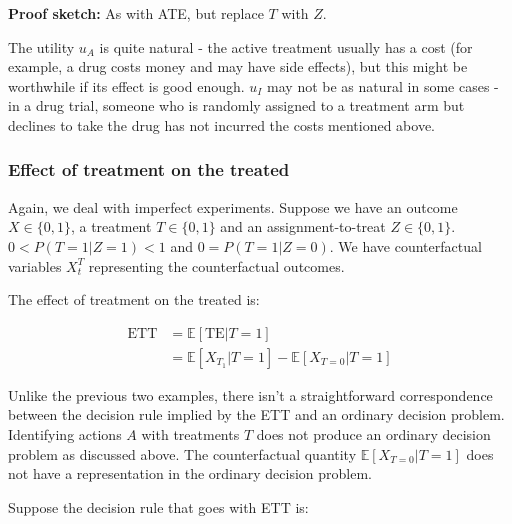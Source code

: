\textbf{Proof sketch:} As with ATE, but replace $T$ with $Z$.

\begin{remark}
The utility $u_A$ is quite natural - the active treatment usually has a cost (for example, a drug costs money and may have side effects), but this might be worthwhile if its effect is good enough. $u_I$ may not be as natural in some cases - in a drug trial, someone who is randomly assigned to a treatment arm but declines to take the drug has not incurred the costs mentioned above.
\end{remark}


\subsubsection{Effect of treatment on the treated}

Again, we deal with imperfect experiments. Suppose we have an outcome $X\in\{0,1\}$, a treatment $T\in\{0,1\}$ and an assignment-to-treat $Z\in\{0,1\}$. $0<P(T=1|Z=1)<1$ and $0=P(T=1|Z=0)$. We have counterfactual variables $X^T_t$ representing the counterfactual outcomes.

The effect of treatment on the treated is:

\begin{align}
    \text{ETT} &= \mathbb{E}[\text{TE}|T=1] \\
               &= \mathbb{E}[X_{T_1}|T=1] - \mathbb{E}[X_{T=0}|T=1]
\end{align}


Unlike the previous two examples, there isn't a straightforward correspondence between the decision rule implied by the ETT and an ordinary decision problem. Identifying actions $A$ with treatments $T$ does not produce an ordinary decision problem as discussed above. The counterfactual quantity $\mathbb{E}[X_{T=0}|T=1]$ does not have a representation in the ordinary decision problem.

Suppose the decision rule that goes with ETT is:

